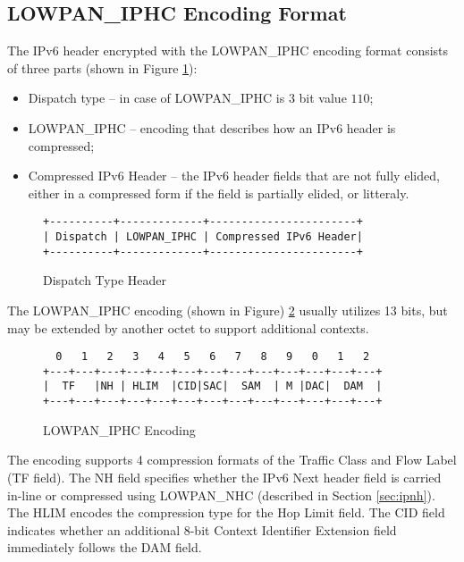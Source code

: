 \documentclass[a4paper,11pt,oneside]{article}
\newenvironment{mylisting}
{\begin{list}{}{\setlength{\leftmargin}{1em}}\item\footnotesize\bfseries}
{\end{list}}
\begin{document}
\subsection{LOWPAN\_IPHC Encoding Format}
The IPv6 header encrypted with the LOWPAN\_IPHC encoding format consists of three parts (shown in Figure \ref{fig:lowpaniphc}):
\begin{itemize}
\item Dispatch type -- in case of LOWPAN\_IPHC is 3 bit value $110$;
\item LOWPAN\_IPHC -- encoding that describes how an IPv6 header is compressed;
\item Compressed IPv6 Header -- the IPv6 header fields that are not fully elided, either in a compressed form if the field is partially elided, or litteraly.
\end{itemize}
\begin{figure}[htp]
\centering
\begin{mylisting}
\begin{verbatim}
+----------+-------------+-----------------------+
| Dispatch | LOWPAN_IPHC | Compressed IPv6 Header|
+----------+-------------+-----------------------+
\end{verbatim}
\end{mylisting}
\caption{Dispatch Type Header}\label{fig:lowpaniphc}
\end{figure}

The LOWPAN\_IPHC encoding (shown in Figure) \ref{fig:lowpanbe} usually utilizes 13 bits, but may be extended by another octet to support additional contexts. 
\begin{figure}[htp]
\centering
\begin{mylisting}
\begin{verbatim}
  0   1   2   3   4   5   6   7   8   9   0   1   2  
+---+---+---+---+---+---+---+---+---+---+---+---+---+
|  TF   |NH | HLIM  |CID|SAC|  SAM  | M |DAC|  DAM  |
+---+---+---+---+---+---+---+---+---+---+---+---+---+
\end{verbatim}
\end{mylisting}
\caption{LOWPAN\_IPHC Encoding}\label{fig:lowpanbe}
\end{figure}

The encoding supports 4 compression formats of the Traffic Class and Flow Label (TF field). The
NH field specifies whether the IPv6 Next header field is carried in-line or compressed using LOWPAN\_NHC (described in Section \ref{sec:ipnh}). The HLIM encodes the compression type for the Hop Limit field. The CID field indicates
whether an additional 8-bit Context Identifier Extension field immediately follows the DAM field. 
\end{document}
